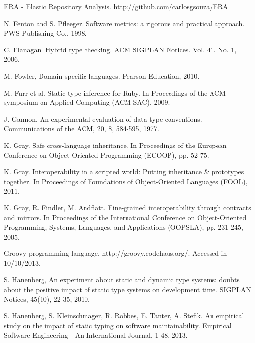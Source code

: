 \documentclass[msc]{ppgccufmg}
\begin{document}
\begin{thebibliography}{}
ERA - Elastic Repository Analysis. http://github.com/carlosgsouza/ERA

N. Fenton and S. Pfleeger. Software metrics: a rigorous and practical approach. PWS Publishing Co., 1998.

C. Flanagan. Hybrid type checking. ACM SIGPLAN Notices. Vol. 41. No. 1, 2006.

M. Fowler, Domain-specific languages. Pearson Education, 2010.

M. Furr et al. Static type inference for Ruby. In Proceedings of the ACM symposium on Applied Computing (ACM SAC), 2009.

J. Gannon.  An experimental evaluation of data type conventions. Communications of the ACM, 20, 8, 584-595, 1977.

K. Gray. Safe cross-language inheritance. In Proceedings of the European Conference on Object-Oriented Programming (ECOOP), pp. 52-75.

K. Gray. Interoperability in a scripted world: Putting inheritance \& prototypes together. In Proceedings of Foundations of Object-Oriented Languages (FOOL), 2011.

K. Gray, R. Findler, M. Andflatt. Fine-grained interoperability through contracts and mirrors. In Proceedings of the International Conference on Object-Oriented Programming, Systems, Languages, and Applications (OOPSLA), pp. 231-245, 2005.

Groovy programming language. http://groovy.codehaus.org/. Accessed in 10/10/2013.

S. Hanenberg, An experiment about static and dynamic type systems: doubts about the positive impact of static type systems on development time. SIGPLAN Notices, 45(10), 22-35, 2010.

S. Hanenberg, S. Kleinschmager, R. Robbes, E. Tanter, A. Stefik. An empirical study on the impact of static typing on software maintainability. Empirical Software Engineering - An International Journal, 1-48, 2013.


\end{thebibliography}
\end{document}
